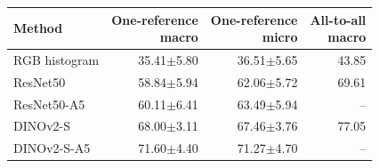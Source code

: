 \begin{tabular}{lrrr}
\toprule
Method & \makecell{One-reference\\macro} & \makecell{One-reference\\micro} & \makecell{All-to-all\\macro} \\
\midrule
RGB histogram & 35.41$\pm$5.80 & 36.51$\pm$5.65 & 43.85 \\
ResNet50 & 58.84$\pm$5.94 & 62.06$\pm$5.72 & 69.61 \\
ResNet50-A5 & 60.11$\pm$6.41 & 63.49$\pm$5.94 & -- \\
DINOv2-S & 68.00$\pm$3.11 & 67.46$\pm$3.76 & 77.05 \\
DINOv2-S-A5 & 71.60$\pm$4.40 & 71.27$\pm$4.70 & -- \\
\bottomrule
\end{tabular}
